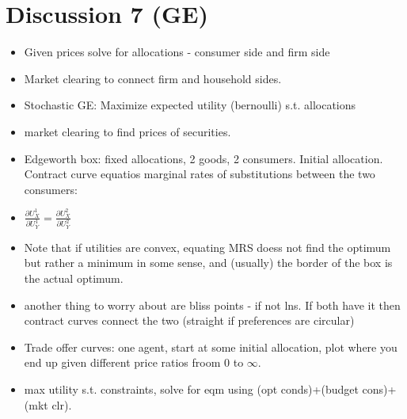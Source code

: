 \documentclass[11pt]{article} %
\begin{document}
\section{Discussion 7 (GE)}
\begin{itemize}
\item Given prices solve for allocations - consumer side and firm side
\item Market clearing to connect firm and household sides.
\item Stochastic GE: Maximize expected utility (bernoulli) s.t. allocations
\item market clearing to find prices of securities.
\item Edgeworth box: fixed allocations, 2 goods, 2 consumers. Initial allocation. Contract curve equatios marginal rates of substitutions between the two consumers:
\item $\frac{\partial U_X^1}{\partial U_Y^1} = \frac{\partial U_X^2}{\partial U_Y^2}$
\item Note that if utilities are convex, equating MRS doess not find the optimum but rather a minimum in some sense, and (usually) the border of the box is the actual optimum.
\item another thing to worry about are bliss points - if not lns. If both have it then contract curves connect the two (straight if preferences are circular)
\item Trade offer curves: one agent, start at some initial allocation, plot where you end up given different price ratios froom $0$ to $\infty$.
\item max utility s.t. constraints, solve for eqm using (opt conds)+(budget cons)+(mkt clr).
\end{itemize}
\end{document}
